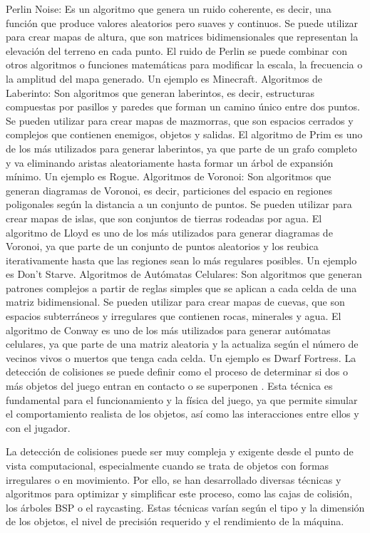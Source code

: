 \documentclass[stu, 12pt, letterpaper, donotrepeattitle, floatsintext, natbib]{apa7}
\begin{document}
Perlin Noise: Es un algoritmo que genera un ruido coherente, es decir, una función que produce valores aleatorios pero suaves y continuos. Se puede utilizar para crear mapas de altura, que son matrices bidimensionales que representan la elevación del terreno en cada punto. El ruido de Perlin se puede combinar con otros algoritmos o funciones matemáticas para modificar la escala, la frecuencia o la amplitud del mapa generado. Un ejemplo es Minecraft.
Algoritmos de Laberinto: Son algoritmos que generan laberintos, es decir, estructuras compuestas por pasillos y paredes que forman un camino único entre dos puntos. Se pueden utilizar para crear mapas de mazmorras, que son espacios cerrados y complejos que contienen enemigos, objetos y salidas. El algoritmo de Prim es uno de los más utilizados para generar laberintos, ya que parte de un grafo completo y va eliminando aristas aleatoriamente hasta formar un árbol de expansión mínimo. Un ejemplo es Rogue.
Algoritmos de Voronoi: Son algoritmos que generan diagramas de Voronoi, es decir, particiones del espacio en regiones poligonales según la distancia a un conjunto de puntos. Se pueden utilizar para crear mapas de islas, que son conjuntos de tierras rodeadas por agua. El algoritmo de Lloyd es uno de los más utilizados para generar diagramas de Voronoi, ya que parte de un conjunto de puntos aleatorios y los reubica iterativamente hasta que las regiones sean lo más regulares posibles. Un ejemplo es Don’t Starve.
Algoritmos de Autómatas Celulares: Son algoritmos que generan patrones complejos a partir de reglas simples que se aplican a cada celda de una matriz bidimensional. Se pueden utilizar para crear mapas de cuevas, que son espacios subterráneos y irregulares que contienen rocas, minerales y agua. El algoritmo de Conway es uno de los más utilizados para generar autómatas celulares, ya que parte de una matriz aleatoria y la actualiza según el número de vecinos vivos o muertos que tenga cada celda. Un ejemplo es Dwarf Fortress.
La detección de colisiones se puede definir como el proceso de determinar si dos o más objetos del juego entran en contacto o se superponen \noindent{}. Esta técnica es fundamental para el funcionamiento y la física del juego, ya que permite simular el comportamiento realista de los objetos, así como las interacciones entre ellos y con el jugador.

La detección de colisiones puede ser muy compleja y exigente desde el punto de vista computacional, especialmente cuando se trata de objetos con formas irregulares o en movimiento. Por ello, se han desarrollado diversas técnicas y algoritmos para optimizar y simplificar este proceso, como las cajas de colisión, los árboles BSP o el raycasting. Estas técnicas varían según el tipo y la dimensión de los objetos, el nivel de precisión requerido y el rendimiento de la máquina.
\end{document}
